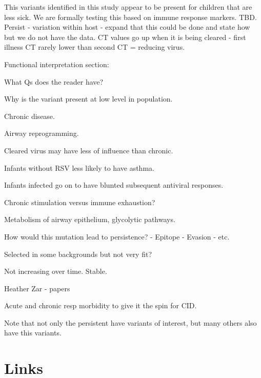 \documentclass{article}
\begin{document}
This variants identified in this study appear to be present for children that are less sick.
We are formally testing this based on immune response markers. TBD.
Persist - variation within host - expand that this could be done and state how but we do not have the data. 
CT values go up when it is being cleared  - first illness CT rarely lower than second CT = reducing virus.

Functional interpretation section:
\begin{description}[noitemsep]
\item What Qs does the reader have?
\item Why is the variant present at low level in population. 
\item Chronic disease.
\item Airway reprogramming.
\item Cleared virus may have less of influence than chronic.
\item Infants without RSV less likely to have asthma.
\item Infants infected go on to have blunted subsequent antiviral responses.
\item Chronic stimulation versus immune exhaustion?
\item Metabolism of airway epithelium, glycolytic pathways.
\item How would this mutation lead to persistence? 
	- Epitope
	- Evasion
	- etc.
\item Selected in some backgrounds but not very fit?
\item Not increasing over time. Stable.
\item Heather Zar - papers
\item Acute and chronic resp morbidity to give it the spin for CID.
	\item Note that not only the persistent have variants of interest, but many others also have this variants. 
\end{description}

\section{Links}
\end{document}

